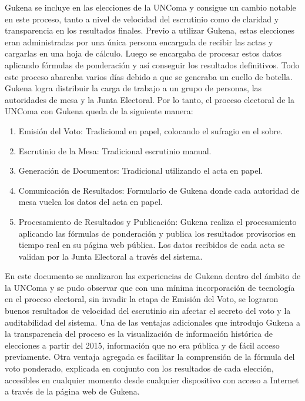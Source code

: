 Gukena se incluye en las elecciones de la UNComa y consigue un cambio notable en este proceso, tanto a nivel de velocidad del escrutinio como de claridad y transparencia en los resultados finales. Previo a utilizar Gukena, estas elecciones eran administradas por una única persona encargada de recibir las actas y cargarlas en una hoja de cálculo. Luego se encargaba de procesar estos datos aplicando fórmulas de ponderación y así conseguir los resultados definitivos. Todo este proceso abarcaba varios días debido a que se generaba un cuello de botella. Gukena logra distribuir la carga de trabajo a un grupo de personas, las autoridades de mesa y la Junta Electoral.\newline
Por lo tanto, el proceso electoral de la UNComa con Gukena queda de la siguiente manera:
\begin{enumerate}
    \item Emisión del Voto: Tradicional en papel, colocando el sufragio en el sobre.
    \item Escrutinio de la Mesa: Tradicional escrutinio manual.
    \item Generación de Documentos: Tradicional utilizando el acta en papel.
    \item Comunicación de Resultados: Formulario de Gukena donde cada autoridad de mesa vuelca los datos del acta en papel.
    \item Procesamiento de Resultados y Publicación: Gukena realiza el procesamiento aplicando las fórmulas de ponderación y publica los resultados provisorios en tiempo real en su página web pública. Los datos recibidos de cada acta se validan por la Junta Electoral a través del sistema.
\end{enumerate}
En este documento se analizaron las experiencias de Gukena dentro del ámbito de la UNComa y se pudo observar que con una mínima incorporación de tecnología en el proceso electoral, sin invadir la etapa de Emisión del Voto, se lograron buenos resultados de velocidad del escrutinio sin afectar el secreto del voto y la auditabilidad del sistema.\newline
Una de las ventajas adicionales que introdujo Gukena a la transparencia del proceso es la visualización de información histórica de elecciones a partir del 2015, información que no era pública y de fácil acceso previamente. Otra ventaja agregada es facilitar la comprensión de la fórmula del voto ponderado, explicada en conjunto con los resultados de cada elección, accesibles en cualquier momento desde cualquier dispositivo con acceso a Internet a través de la página web de Gukena.\newline
